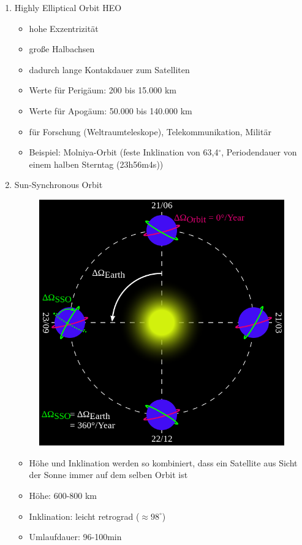 \begin{enumerate}
 \item Highly Elliptical Orbit HEO
 \begin{itemize}
  \item hohe Exzentrizität
  \item große Halbachsen
  \item dadurch lange Kontakdauer zum Satelliten
  \item Werte für Perigäum: 200 bis 15.000 km
  \item Werte für Apogäum: 50.000 bis 140.000 km
  \item für Forschung (\zb Weltraumteleskope), Telekommunikation, Militär 
  \item Beispiel: Molniya-Orbit (feste Inklination von 63,4$^\circ$, Periodendauer von einem halben Sterntag (23h56m4s))
 \end{itemize}
 \item Sun-Synchronous Orbit
 \begin{figure}[!ht]
  \centering
  \includegraphics[scale=0.4]{sso}
 \end{figure}
 \begin{itemize}
  \item Höhe und Inklination werden so kombiniert, dass ein Satellite aus Sicht der Sonne immer auf dem selben Orbit ist
  \item Höhe: 600-800 km
  \item Inklination: leicht retrograd ($\approx 98^\circ$)
  \item Umlaufdauer: 96-100min
 \end{itemize}


\end{enumerate}
